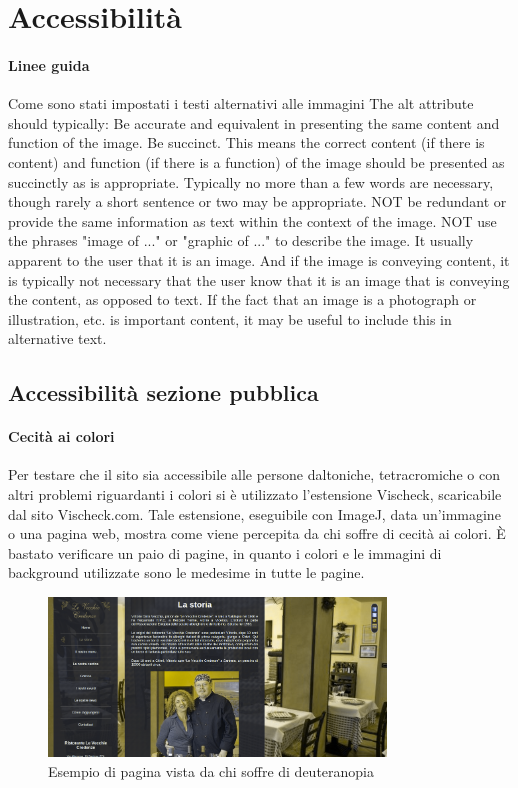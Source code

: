 \section{Accessibilità}

\paragraph{Linee guida}

Come sono stati impostati i testi alternativi alle immagini
The alt attribute should typically:
Be accurate and equivalent in presenting the same content and function of the image.
Be succinct. This means the correct content (if there is content) and function (if there is a function) of the image should be presented as succinctly as is appropriate. Typically no more than a few words are necessary, though rarely a short sentence or two may be appropriate.
NOT be redundant or provide the same information as text within the context of the image.
NOT use the phrases "image of ..." or "graphic of ..." to describe the image. It usually apparent to the user that it is an image. And if the image is conveying content, it is typically not necessary that the user know that it is an image that is conveying the content, as opposed to text. If the fact that an image is a photograph or illustration, etc. is important content, it may be useful to include this in alternative text.

\subsection{Accessibilità sezione pubblica}

\paragraph{Cecità ai colori}
Per testare che il sito sia accessibile alle persone daltoniche, tetracromiche o con altri problemi riguardanti i colori si è utilizzato l'estensione Vischeck, scaricabile dal sito Vischeck.com. Tale estensione, eseguibile con ImageJ, data un'immagine o una pagina web, mostra come viene percepita da chi soffre di cecità ai colori. È bastato verificare un paio di pagine, in quanto i colori e le immagini di background utilizzate sono le medesime in tutte le pagine.

\begin{figure}[H]
		\centering \includegraphics[width=0.8\textwidth]{images/color1.png}
		\caption{Esempio di pagina vista da chi soffre di deuteranopia}
\end{figure}
	
